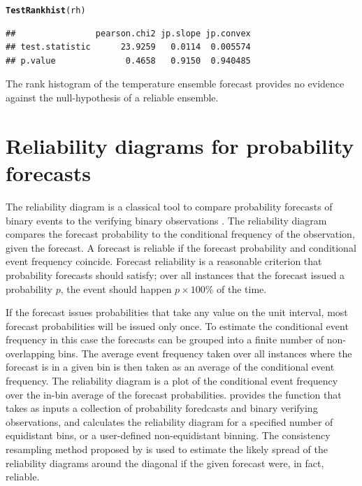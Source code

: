 \documentclass[article]{jss}\usepackage{graphicx, color}
\makeatletter
\newcommand{\hlfunctioncall}[1]{\textcolor[rgb]{0,0.501960784313725,0.752941176470588}{\textbf{#1}}}%
\newenvironment{kframe}{%
 \def\at@end@of@kframe{}%
 \ifinner\ifhmode%
  \def\at@end@of@kframe{\end{minipage}}%
  \begin{minipage}{\columnwidth}%
 \fi\fi%
 \def\FrameCommand##1{\hskip\@totalleftmargin \hskip-\fboxsep
 \colorbox{shadecolor}{##1}\hskip-\fboxsep
     \hskip-\linewidth \hskip-\@totalleftmargin \hskip\columnwidth}%
 \MakeFramed {\advance\hsize-\width
   \@totalleftmargin\z@ \linewidth\hsize
   \@setminipage}}%
 {\par\unskip\endMakeFramed%
 \at@end@of@kframe}
\newenvironment{knitrout}{}{} %
\makeatother
\begin{document}
\begin{knitrout}
\color{fgcolor}\begin{kframe}
\begin{alltt}
\hlfunctioncall{TestRankhist}(rh)
\end{alltt}
\begin{verbatim}
##                pearson.chi2 jp.slope jp.convex
## test.statistic      23.9259   0.0114  0.005574
## p.value              0.4658   0.9150  0.940485
\end{verbatim}
\end{kframe}
\end{knitrout}


The rank histogram of the temperature ensemble forecast provides no evidence against the null-hypothesis of a reliable ensemble.

\section{Reliability diagrams for probability forecasts}

The reliability diagram is a classical tool to compare probability forecasts of binary events to the verifying binary observations \citep{jolliffe2012forecast}.
The reliability diagram compares the forecast probability to the conditional frequency of the observation, given the forecast.
A forecast is reliable if the forecast probability and conditional event frequency coincide.
Forecast reliability is a reasonable criterion that probability forecasts should satisfy; over all instances that the forecast issued a probability $p$, the event should happen $p\times 100\%$ of the time.

If the forecast issues probabilities that take any value on the unit interval, most forecast probabilities will be issued only once.
To estimate the conditional event frequency in this case the forecasts can be grouped into a finite number of non-overlapping bins.
The average event frequency taken over all instances where the forecast is in a given bin is then taken as an average of the conditional event frequency.
The reliability diagram is a plot of the conditional event frequency over the in-bin average of the forecast probabilities.
 provides the function  that takes as inputs a collection of probability foredcasts and binary verifying observations, and calculates the reliability diagram for a specified number of equidistant bins, or a user-defined non-equidistant binning.
The consistency resampling method proposed by \citet{broecker2007increasing} is used to estimate the likely spread of the reliability diagrams around the diagonal if the given forecast were, in fact, reliable.
\end{document}
